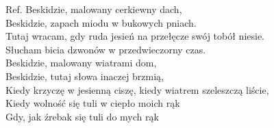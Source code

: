 \begin{flushleft}
\vskip 3mm
Ref. Beskidzie, malowany cerkiewny dach, \\
\hspace{0.9cm}Beskidzie, zapach miodu w bukowych pniach. \\
\hspace{0.9cm}Tutaj wracam, gdy ruda jesień na przełęcze swój tobół niesie. \\
\hspace{0.9cm}Słucham bicia dzwonów w przedwieczorny czas. \\
\hspace{0.9cm}Beskidzie, malowany wiatrami dom, \\
\hspace{0.9cm}Beskidzie, tutaj słowa inaczej brzmią, \\
\hspace{0.9cm}Kiedy krzyczę w jesienną ciszę, kiedy wiatrem szeleszczą liście, \\
\hspace{0.9cm}Kiedy wolność się tuli w ciepło moich rąk \\
\hspace{0.9cm}Gdy, jak źrebak się tuli do mych rąk \\
\end{flushleft}
\clearpage
